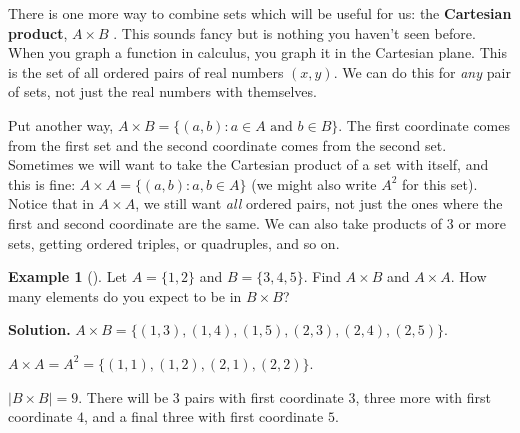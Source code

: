 \documentclass[12pt,]{book}
\newcommand{\terminology}[1]{\textbf{#1}}
\theoremstyle{plain}
\theoremstyle{definition}
\theoremstyle{definition}
\newtheorem{example}[theorem]{Example}
\theoremstyle{definition}
\numberwithin{equation}{chapter}
\newcommand{\st}{:}
\begin{document}
\hypertarget{p-596}{}%
There is one more way to combine sets which will be useful for us: the \terminology{Cartesian product}, \(A \times B\)\label{notation-25}
. This sounds fancy but is nothing you haven't seen before. When you graph a function in calculus, you graph it in the Cartesian plane. This is the set of all ordered pairs of real numbers \((x,y)\). We can do this for \emph{any} pair of sets, not just the real numbers with themselves.%
\par
\hypertarget{p-597}{}%
Put another way, \(A \times B = \{(a,b) \st a \in A \text{ and } b \in B\}\). The first coordinate comes from the first set and the second coordinate comes from the second set. Sometimes we will want to take the Cartesian product of a set with itself, and this is fine: \(A \times A = \{(a,b) \st a, b \in A\}\) (we might also write \(A^2\) for this set). Notice that in \(A \times A\), we still want \emph{all} ordered pairs, not just the ones where the first and second coordinate are the same. We can also take products of 3 or more sets, getting ordered triples, or quadruples, and so on.%
\begin{example}[]\label{example-33}
\hypertarget{p-598}{}%
Let \(A = \{1,2\}\) and \(B = \{3,4,5\}\). Find \(A \times B\) and \(A \times A\). How many elements do you expect to be in \(B \times B\)?%
\par\smallskip%
\noindent\textbf{Solution.}\hypertarget{solution-68}{}\quad%
\hypertarget{p-599}{}%
\(A \times B = \{(1,3), (1,4), (1,5), (2,3), (2,4), (2,5)\}\).%
\par
\hypertarget{p-600}{}%
\(A \times A = A^2 = \{(1,1), (1,2), (2,1), (2,2)\}\).%
\par
\hypertarget{p-601}{}%
\(|B\times B| = 9\). There will be 3 pairs with first coordinate \(3\), three more with first coordinate \(4\), and a final three with first coordinate \(5\).%
\end{example}
\typeout{************************************************}
\typeout{************************************************}
\end{document}

